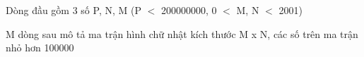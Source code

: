 Dòng đầu gồm 3 số P, N, M (P $<$ 200000000, 0 $<$ M, N $<$ 2001)   


   M dòng sau mô tả ma trận hình chữ nhật kích thước M x N, các số trên ma trận nhỏ hơn 100000